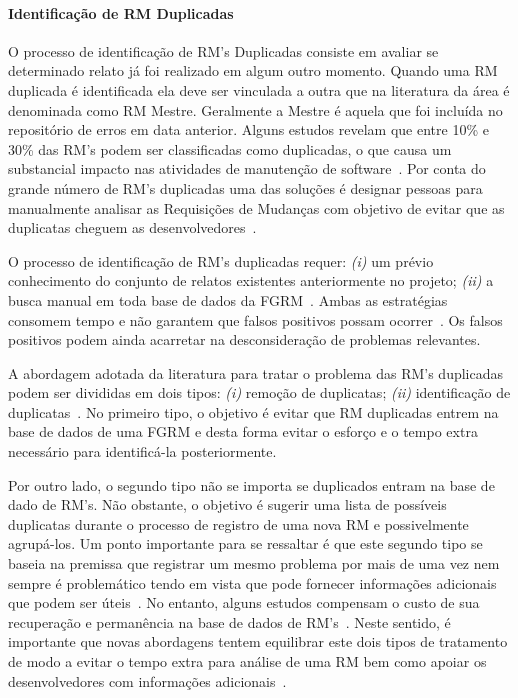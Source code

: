 \paragraph{Identificação de RM Duplicadas} O processo de identificação de RM's
Duplicadas consiste em avaliar se determinado relato já foi realizado em algum
outro momento. Quando uma RM duplicada é identificada ela deve ser vinculada a
outra que na literatura da área é denominada como RM Mestre. Geralmente a Mestre
é aquela que foi incluída no repositório de erros em data anterior. Alguns
estudos revelam que entre 10\% e 30\% das RM's podem ser classificadas como
duplicadas, o que causa um substancial impacto nas atividades de manutenção de
software~\cite{anvik2005coping,cavalcanti2013bug,Runeson:2007:DDD:1248820.1248882}.
Por conta do grande número de RM's duplicadas uma das soluções é designar pessoas
para manualmente analisar as Requisições de Mudanças com objetivo de
evitar que as duplicatas cheguem as desenvolvedores~\cite{anvik2005coping}.

O processo de identificação de RM's duplicadas requer: \textit{(i)} um prévio
conhecimento do conjunto de relatos existentes anteriormente no projeto;
\textit{(ii)} a busca manual em toda base de dados da
FGRM~\cite{banerjee2012automated,
	Lerch:2013:FDY:2495256.2495763,hindle2016contextual}. Ambas as estratégias
consomem tempo e não garantem que falsos positivos possam
ocorrer~\cite{kaushik2012comparative}. Os falsos positivos podem ainda acarretar
na desconsideração de problemas relevantes.

A abordagem adotada da literatura para tratar o problema das RM's duplicadas
podem ser divididas em dois tipos\cite{kaushik2012comparative,
	tian2012improved}: \textit{(i)} remoção de duplicatas; \textit{(ii)}
identificação de duplicatas~\cite{cavalcanti2014challenges}. No primeiro tipo, o
objetivo é evitar que RM duplicadas entrem na base de dados de uma FGRM e desta
forma evitar o esforço e o tempo extra necessário para identificá-la
posteriormente.

Por outro lado, o segundo tipo não se importa se duplicados entram na base de
dado de RM's. Não obstante, o objetivo é sugerir uma lista de possíveis
duplicatas durante o processo de registro de uma nova RM e possivelmente
agrupá-los. Um ponto importante para se ressaltar é que este segundo tipo se
baseia na premissa que registrar um mesmo problema por mais de uma vez nem
sempre é problemático tendo em vista que pode fornecer informações adicionais
que podem ser úteis~\cite{bettenburg2008duplicate}. No entanto, alguns estudos
compensam o custo de sua recuperação e permanência na base de dados de
RM's~\cite{davidson2011coping}. Neste sentido, é importante que novas abordagens
tentem equilibrar este dois tipos de tratamento de modo a evitar o tempo extra
para análise de uma RM bem como apoiar os desenvolvedores com informações
adicionais~\cite{Lerch:2013:FDY:2495256.2495763,Thung2014}.

